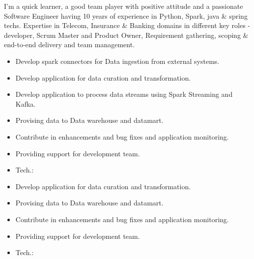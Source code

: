 \documentclass[9pt,a4paper,ragged2e,withhyper]{altacv}
\begin{document}
\begin{paracol}{2}

\begin{justify}
I’m a quick learner, a good team player with positive attitude and a passionate Software Engineer having 10 years of experience in Python, Spark, java \& spring techs. Expertise in Telecom, Insurance \& Banking domains in different key roles - developer, Scrum Master and Product Owner, Requirement gathering, scoping \& end-to-end delivery and team management. 
\end{justify}


\begin{itemize}
\item Develop spark connectors for Data ingestion from external systems.
\item Develop application for data curation and transformation.
\item Develop application to process data streams using Spark Streaming and Kafka.
\item Provising data to Data warehouse and datamart.
\item Contribute in enhancements and bug fixes and application monitoring.
\item Providing support for development team.
\item Tech.:       
\end{itemize}

\divider

\begin{itemize} 
\item Develop application for data curation and transformation.
\item Provising data to Data warehouse and datamart.
\item Contribute in enhancements and bug fixes and application monitoring.
\item Providing support for development team.
\item Tech.:    
\end{itemize}


\end{paracol}
\end{document}
